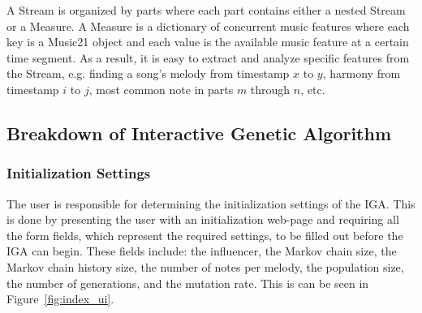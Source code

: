 \documentclass[12pt]{article} %
\begin{document}
A Stream is organized by parts where each part contains either a nested Stream or a Measure. A Measure is a dictionary of concurrent music features where each key is a Music21 object and each value is the available music feature at a certain time segment.   As a result, it is easy to extract and analyze specific features from the Stream, e.g. finding a song's melody from timestamp $x$
to $y$, harmony from timestamp $i$ to $j$, most common note in parts $m$ through $n$, etc.


\subsection{Breakdown of Interactive Genetic Algorithm}
\subsubsection{Initialization Settings}
The user is responsible for determining the initialization settings of the IGA. This is done by presenting the user with an initialization web-page and requiring all the form fields, which represent the required settings, to be filled out before the IGA can begin. These fields include: the influencer, the Markov chain size, the Markov chain history size, the number of notes per melody, the population size, the number of generations, and the mutation rate. This is can be seen in Figure~\ref{fig:index_ui}. 
\end{document}

